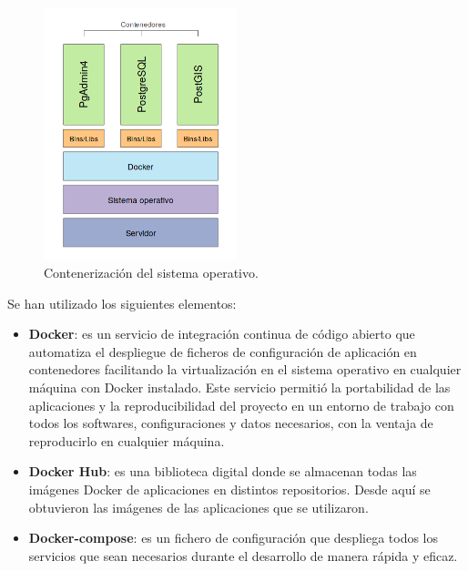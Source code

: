 \begin{figure}
\begin{center}
\includegraphics[width=0.5\textwidth]{Metodologia/Figs/docker.png}
\caption{Contenerización del sistema operativo. \label{fig:docker}}
\end{center}
\end{figure}

Se han utilizado los siguientes elementos:
\begin{itemize}
\item\textbf{Docker}: es un servicio de integración continua de código abierto que automatiza el despliegue de ficheros de configuración de aplicación en contenedores facilitando la virtualización en el sistema operativo en cualquier máquina con Docker instalado. Este servicio permitió la portabilidad de las aplicaciones y la reproducibilidad del proyecto en un entorno de trabajo con todos los softwares, configuraciones y datos necesarios, con la ventaja de reproducirlo en cualquier máquina.
\item\textbf{Docker Hub}: es una biblioteca digital donde se almacenan todas las imágenes Docker de aplicaciones en distintos repositorios. Desde aquí se obtuvieron las imágenes de las aplicaciones que se utilizaron.
\item\textbf{Docker-compose}: es un fichero de configuración que despliega todos los servicios que sean necesarios durante el desarrollo de manera rápida y eficaz.
\end{itemize}



